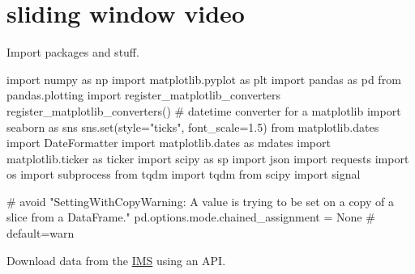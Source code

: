 \documentclass[
  letterpaper,
  DIV=11,
  numbers=noendperiod,
  oneside]{scrreprt}
\newenvironment{Shaded}{\begin{snugshade}}{\end{snugshade}}
\newcommand{\BuiltInTok}[1]{\textcolor[rgb]{0.00,0.23,0.31}{#1}}
\newcommand{\CommentTok}[1]{\textcolor[rgb]{0.37,0.37,0.37}{#1}}
\newcommand{\FloatTok}[1]{\textcolor[rgb]{0.68,0.00,0.00}{#1}}
\newcommand{\ImportTok}[1]{\textcolor[rgb]{0.00,0.46,0.62}{#1}}
\newcommand{\NormalTok}[1]{\textcolor[rgb]{0.00,0.23,0.31}{#1}}
\newcommand{\OperatorTok}[1]{\textcolor[rgb]{0.37,0.37,0.37}{#1}}
\newcommand{\StringTok}[1]{\textcolor[rgb]{0.13,0.47,0.30}{#1}}
\newcommand{\VariableTok}[1]{\textcolor[rgb]{0.07,0.07,0.07}{#1}}
\begin{document}
\hypertarget{sliding-window-video}{%
\chapter*{sliding window video}\label{sliding-window-video}}


Import packages and stuff.

\begin{Shaded}
\begin{Highlighting}[]
\ImportTok{import}\NormalTok{ numpy }\ImportTok{as}\NormalTok{ np}
\ImportTok{import}\NormalTok{ matplotlib.pyplot }\ImportTok{as}\NormalTok{ plt}
\ImportTok{import}\NormalTok{ pandas }\ImportTok{as}\NormalTok{ pd}
\ImportTok{from}\NormalTok{ pandas.plotting }\ImportTok{import}\NormalTok{ register\_matplotlib\_converters}
\NormalTok{register\_matplotlib\_converters()  }\CommentTok{\# datetime converter for a matplotlib}
\ImportTok{import}\NormalTok{ seaborn }\ImportTok{as}\NormalTok{ sns}
\NormalTok{sns.}\BuiltInTok{set}\NormalTok{(style}\OperatorTok{=}\StringTok{"ticks"}\NormalTok{, font\_scale}\OperatorTok{=}\FloatTok{1.5}\NormalTok{)}
\ImportTok{from}\NormalTok{ matplotlib.dates }\ImportTok{import}\NormalTok{ DateFormatter}
\ImportTok{import}\NormalTok{ matplotlib.dates }\ImportTok{as}\NormalTok{ mdates}
\ImportTok{import}\NormalTok{ matplotlib.ticker }\ImportTok{as}\NormalTok{ ticker}
\ImportTok{import}\NormalTok{ scipy }\ImportTok{as}\NormalTok{ sp}
\ImportTok{import}\NormalTok{ json}
\ImportTok{import}\NormalTok{ requests}
\ImportTok{import}\NormalTok{ os}
\ImportTok{import}\NormalTok{ subprocess}
\ImportTok{from}\NormalTok{ tqdm }\ImportTok{import}\NormalTok{ tqdm}
\ImportTok{from}\NormalTok{ scipy }\ImportTok{import}\NormalTok{ signal}

\CommentTok{\# avoid "SettingWithCopyWarning: A value is trying to be set on a copy of a slice from a DataFrame."}
\NormalTok{pd.options.mode.chained\_assignment }\OperatorTok{=} \VariableTok{None}  \CommentTok{\# default=\textquotesingle{}warn\textquotesingle{}}
\end{Highlighting}
\end{Shaded}

Download data from the \href{https://ims.gov.il/en/data_gov}{IMS} using
an API.
\end{document}
